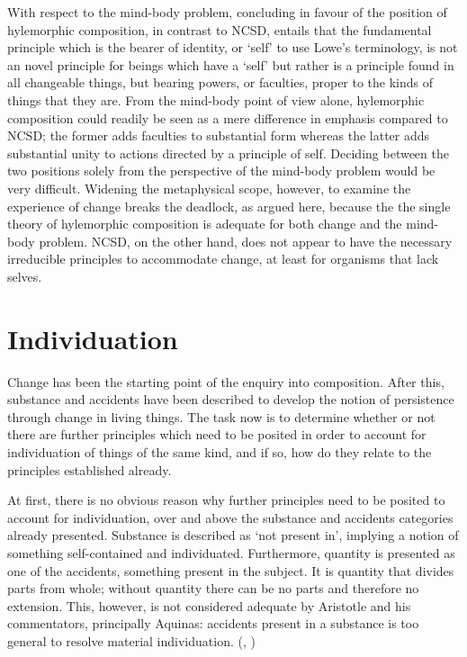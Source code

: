 With respect to the mind-body problem, concluding in favour of the position of hylemorphic composition, in contrast to NCSD, entails that the fundamental principle which is the bearer of identity, or `self' to use Lowe's terminology, is not an novel principle for beings which have a `self' but rather is a principle found in all changeable things, but bearing powers, or faculties, proper to the kinds of things that they are. From the mind-body point of view alone, hylemorphic composition could readily be seen as a mere difference in emphasis compared to NCSD; the former adds faculties to substantial form whereas the latter adds substantial unity to actions directed by a principle of self. Deciding between the two positions solely from the perspective of the mind-body problem would be very difficult. Widening the metaphysical scope, however, to examine the experience of change breaks the deadlock, as argued here, because the the single theory of hylemorphic composition is adequate for both change and the mind-body problem. NCSD, on the other hand, does not appear to have the necessary irreducible principles to accommodate change, at least for organisms that lack selves.


\section{Individuation}

Change has been the starting point of the enquiry into composition. After this, substance and accidents have been described to develop the notion of persistence through change in living things. The task now is to determine whether or not there are further principles which need to be posited in order to account for individuation of things of the same kind, and if so, how do they relate to the principles established already.

At first, there is no obvious reason why further principles need to be posited to account for individuation, over and above the substance and accidents categories already presented. Substance is described as `not present in', implying a notion of something self-contained and individuated. Furthermore, quantity is presented as one of the accidents, something present in the subject. It is quantity that divides parts from whole; without quantity there can be no parts and therefore no extension. This, however, is not considered adequate by Aristotle and his commentators, principally Aquinas: accidents present in a substance is too general to resolve material individuation. (\cite[][103]{dominguez1991metaphysics}, \cite[][11]{klima-aquinas-contemporary})

